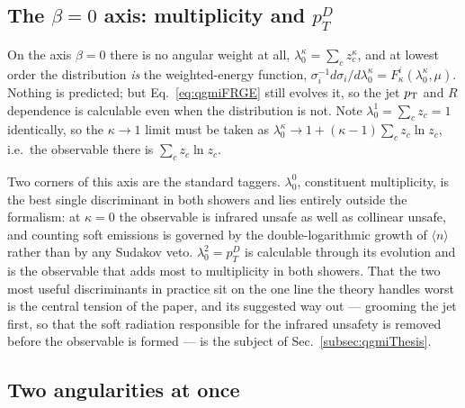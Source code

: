 \subsection{The \(\beta=0\) axis: multiplicity and \(p_T^D\)}
\label{subsec:qgmiBetaZero}

On the axis \(\beta=0\) there is no angular weight at all, \(\lambda^\kappa_0=\sum_c z_c^\kappa\),
and at lowest order the distribution \emph{is} the weighted-energy function,
\(\sigma_i^{-1}d\sigma_i/d\lambda^\kappa_0 = F^i_\kappa(\lambda^\kappa_0,\mu)\).
Nothing is predicted; but Eq.~\ref{eq:qgmiFRGE} still evolves it, so the jet
\(p_{\rm T}\) and \(R\) dependence is calculable even when the distribution is not.
Note \(\lambda^1_0=\sum_cz_c=1\) identically, so the \(\kappa\to1\) limit must be
taken as \(\lambda^\kappa_0\to1+(\kappa-1)\sum_cz_c\ln z_c\), i.e.\ the observable
there is \(\sum_c z_c\ln z_c\).

Two corners of this axis are the standard taggers. \(\lambda^0_0\), constituent
multiplicity, is the best single discriminant in both showers and lies entirely
outside the formalism: at \(\kappa=0\) the observable is infrared unsafe as well as
collinear unsafe, and counting soft emissions is governed by the
double-logarithmic growth of \(\langle n\rangle\) rather than by any Sudakov veto.
\(\lambda^2_0 = p_T^D\) is calculable through its evolution and is the observable
that adds most to multiplicity in both showers. That the two most useful
discriminants in practice sit on the one line the theory handles worst is the central
tension of the paper, and its suggested way out --- grooming the jet first, so that
the soft radiation responsible for the infrared unsafety is removed before the
observable is formed --- is the subject of Sec.~\ref{subsec:qgmiThesis}.

\subsection{Two angularities at once}
\label{subsec:qgmiPairs}

